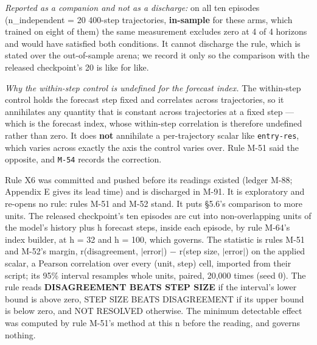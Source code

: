 \documentclass[10pt]{article}
\begin{document}
\emph{Reported as a companion and not as a discharge:} on all ten episodes (n\_independent = 20 400-step trajectories, \textbf{in-sample} for these arms, which trained on eight of them) the same measurement excludes zero at 4 of 4 horizons and would have satisfied both conditions. It cannot discharge the rule, which is stated over the out-of-sample arena; we record it only so the comparison with the released checkpoint's 20 is like for like.

\emph{Why the within-step control is undefined for the forecast index.} The within-step control holds the forecast step fixed and correlates across trajectories, so it annihilates any quantity that is constant across trajectories at a fixed step --- which is the forecast index, whose within-step correlation is therefore undefined rather than zero. It does \textbf{not} annihilate a per-trajectory scalar like \texttt{entry-res}, which varies across exactly the axis the control varies over. Rule M-51 said the opposite, and \texttt{M-54} records the correction.


Rule X6 was committed and pushed before its readings existed (ledger M-88; Appendix E gives its lead time) and is discharged in M-91. It is exploratory and re-opens no rule: rules M-51 and M-52 stand. It puts \S{}5.6's comparison to more units. The released checkpoint's ten episodes are cut into non-overlapping units of the model's history plus h forecast steps, inside each episode, by rule M-64's index builder, at h = 32 and h = 100, which governs. The statistic is rules M-51 and M-52's margin, r(disagreement, $|$error$|$) $-$ r(step size, $|$error$|$) on the applied scalar, a Pearson correlation over every (unit, step) cell, imported from their script; its 95\% interval resamples whole units, paired, 20,000 times (seed 0). The rule reads \textbf{DISAGREEMENT BEATS STEP SIZE} if the interval's lower bound is above zero, STEP SIZE BEATS DISAGREEMENT if its upper bound is below zero, and NOT RESOLVED otherwise. The minimum detectable effect was computed by rule M-51's method at this n before the reading, and governs nothing.

\begin{center}\small{}\end{center}
\end{document}
